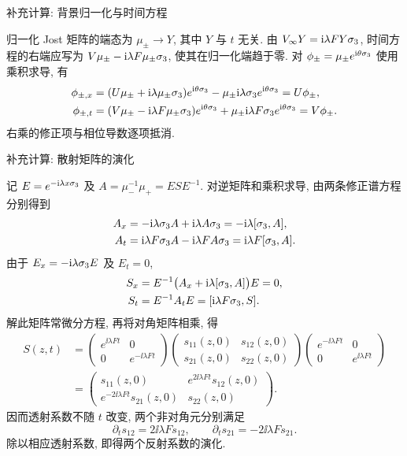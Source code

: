 \par\medskip\noindent 补充计算: 背景归一化与时间方程\par
归一化 Jost 矩阵的端态为 $\mu_\pm\to Y$, 其中 $Y$ 与 $t$ 无关.
由 $V_\infty Y=\mathrm{i}\lambda F Y\sigma_3$, 时间方程的右端应写为
$V\mu_\pm-\mathrm{i}\lambda F\mu_\pm\sigma_3$, 使其在归一化端趋于零.
对 $\phi_\pm=\mu_\pm e^{\mathrm{i}\theta\sigma_3}$ 使用乘积求导, 有
\begin{align*}
\phi_{\pm,x}
&=(U\mu_\pm+\mathrm{i}\lambda\mu_\pm\sigma_3)e^{\mathrm{i}\theta\sigma_3}
-\mu_\pm\mathrm{i}\lambda\sigma_3 e^{\mathrm{i}\theta\sigma_3}
=U\phi_\pm,\\
\phi_{\pm,t}
&=(V\mu_\pm-\mathrm{i}\lambda F\mu_\pm\sigma_3)e^{\mathrm{i}\theta\sigma_3}
+\mu_\pm\mathrm{i}\lambda F\sigma_3 e^{\mathrm{i}\theta\sigma_3}
=V\phi_\pm.
\end{align*}
右乘的修正项与相位导数逐项抵消.

\par\medskip\noindent 补充计算: 散射矩阵的演化\par
记 $E=e^{-\mathrm{i}\lambda x\sigma_3}$ 及 $A=\mu_-^{-1}\mu_+=ESE^{-1}$.
对逆矩阵和乘积求导, 由两条修正谱方程分别得到
\begin{align*}
A_x
&=-\mathrm{i}\lambda\sigma_3 A+\mathrm{i}\lambda A\sigma_3
=-\mathrm{i}\lambda[\sigma_3,A],\\
A_t
&=\mathrm{i}\lambda F\sigma_3 A-\mathrm{i}\lambda F A\sigma_3
=\mathrm{i}\lambda F[\sigma_3,A].
\end{align*}
由于 $E_x=-\mathrm{i}\lambda\sigma_3 E$ 及 $E_t=0$,
\begin{align*}
S_x&=E^{-1}\bigl(A_x+\mathrm{i}\lambda[\sigma_3,A]\bigr)E=0,\\
S_t&=E^{-1}A_tE=[\mathrm{i}\lambda F\sigma_3,S].
\end{align*}
解此矩阵常微分方程, 再将对角矩阵相乘, 得
\begin{align*}
S(z,t)
&=\begin{pmatrix}e^{\ii\lambda Ft}&0\\0&e^{-\ii\lambda Ft}\end{pmatrix}
\begin{pmatrix}s_{11}(z,0)&s_{12}(z,0)\\s_{21}(z,0)&s_{22}(z,0)\end{pmatrix}
\begin{pmatrix}e^{-\ii\lambda Ft}&0\\0&e^{\ii\lambda Ft}\end{pmatrix}\\
&=\begin{pmatrix}
s_{11}(z,0)&e^{2\ii\lambda Ft}s_{12}(z,0)\\
e^{-2\ii\lambda Ft}s_{21}(z,0)&s_{22}(z,0)
\end{pmatrix}.
\end{align*}
因而透射系数不随 $t$ 改变, 两个非对角元分别满足
\begin{equation*}
\partial_t s_{12}=2\ii\lambda F s_{12},\qquad
\partial_t s_{21}=-2\ii\lambda F s_{21}.
\end{equation*}
除以相应透射系数, 即得两个反射系数的演化.

